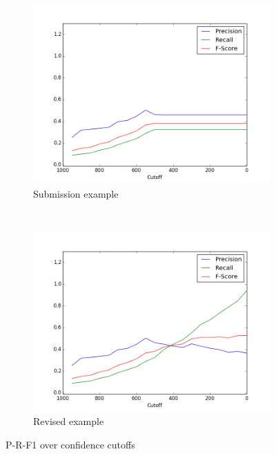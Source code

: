 \documentclass{article}
\begin{document}
\def \officialRunWidth {0.23\textwidth}
\begin{figure}[tb]
  \centering
    \begin{subfigure}[b]{\officialRunWidth}
            \includegraphics[width=\textwidth,clip=true,trim=15mm 0mm 15mm 5mm]{fig/clust_dyn_wrong.png}
      \caption{Submission example}
      \label{official:submission}
    \end{subfigure}
    ~
    \begin{subfigure}[b]{\officialRunWidth}
            \includegraphics[width=\textwidth,clip=true,trim=15mm 0mm 15mm 5mm]{fig/clust_dyn_right.png}
      \caption{Revised example}
      \label{official:revised}
    \end{subfigure}
\caption{P-R-F1 over confidence cutoffs}
\label{submissionAndRevised}
\end{figure}
\end{document}
